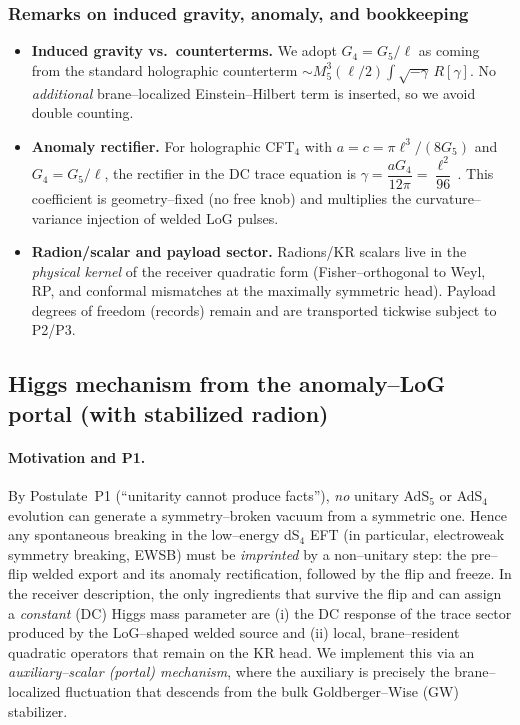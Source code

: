 \documentclass[10pt]{article}
\theoremstyle{definition}
\theoremstyle{plain}
\begin{document}
\subsubsection*{Remarks on induced gravity, anomaly, and bookkeeping}
\label{subsubsec:bookkeeping}

\begin{itemize}[leftmargin=1.6em]
\item \textbf{Induced gravity vs.\ counterterms.} We adopt \(G_4=G_5/\ell\) as coming from the standard holographic counterterm \(\sim M_5^3(\ell/2) \!\int \!\sqrt{-\gamma}\,R[\gamma]\). No \emph{additional} brane–localized Einstein–Hilbert term is inserted, so we avoid double counting.
\item \textbf{Anomaly rectifier.} For holographic CFT\(_4\) with \(a=c=\pi \ell^3/(8G_5)\) and \(G_4=G_5/\ell\), the rectifier in the DC trace equation is
\(
\gamma=\dfrac{a G_4}{12\pi}=\dfrac{\ell^2}{96}\,.
\)
This coefficient is geometry–fixed (no free knob) and multiplies the curvature–variance injection of welded LoG pulses.
\item \textbf{Radion/scalar and payload sector.} Radions/KR scalars live in the \emph{physical kernel} of the receiver quadratic form (Fisher–orthogonal to Weyl, RP, and conformal mismatches at the maximally symmetric head). Payload degrees of freedom (records) remain and are transported tickwise subject to P2/P3.
\end{itemize}

\subsection{Higgs mechanism from the anomaly–LoG portal (with stabilized radion)}
\label{subsec:higgs-from-log}

\paragraph{Motivation and P1.}\label{par:uom-main-116}
By Postulate~P1 (``unitarity cannot produce facts''), \emph{no} unitary AdS$_5$ or AdS$_4$ evolution
can generate a symmetry–broken vacuum from a symmetric one. Hence any spontaneous breaking in the
low–energy dS$_4$ EFT (in particular, electroweak symmetry breaking, EWSB) must be \emph{imprinted}
by a non–unitary step: the pre–flip welded export and its anomaly rectification, followed by the flip
and freeze. In the receiver description, the only ingredients that survive the flip and can assign a
\emph{constant} (DC) Higgs mass parameter are (i) the DC response of the trace sector produced by the
LoG–shaped welded source and (ii) local, brane--resident quadratic operators that remain on the KR head.
We implement this via an \emph{auxiliary--scalar (portal) mechanism},
where the auxiliary is precisely the brane–localized fluctuation that descends from the bulk
Goldberger–Wise (GW) stabilizer.
\end{document}

